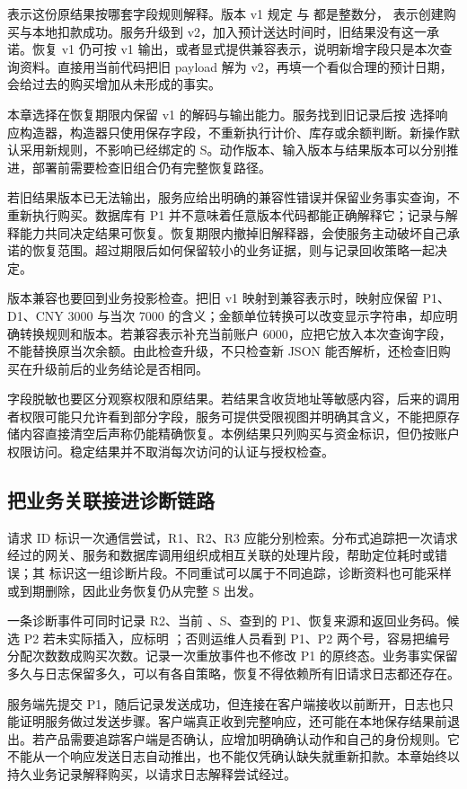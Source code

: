  表示这份原结果按哪套字段规则解释。版本 v1 规定  与  都是整数分， 表示创建购买与本地扣款成功。服务升级到 v2，加入预计送达时间时，旧结果没有这一承诺。恢复 v1 仍可按 v1 输出，或者显式提供兼容表示，说明新增字段只是本次查询资料。直接用当前代码把旧 payload 解为 v2，再填一个看似合理的预计日期，会给过去的购买增加从未形成的事实。

本章选择在恢复期限内保留 v1 的解码与输出能力。服务找到旧记录后按  选择响应构造器，构造器只使用保存字段，不重新执行计价、库存或余额判断。新操作默认采用新规则，不影响已经绑定的 S。动作版本、输入版本与结果版本可以分别推进，部署前需要检查旧组合仍有完整恢复路径。

若旧结果版本已无法输出，服务应给出明确的兼容性错误并保留业务事实查询，不重新执行购买。数据库有 P1 并不意味着任意版本代码都能正确解释它；记录与解释能力共同决定结果可恢复。恢复期限内撤掉旧解释器，会使服务主动破坏自己承诺的恢复范围。超过期限后如何保留较小的业务证据，则与记录回收策略一起决定。



版本兼容也要回到业务投影检查。把旧 v1 映射到兼容表示时，映射应保留 P1、D1、CNY 3000 与当次 7000 的含义；金额单位转换可以改变显示字符串，却应明确转换规则和版本。若兼容表示补充当前账户 6000，应把它放入本次查询字段，不能替换原当次余额。由此检查升级，不只检查新 JSON 能否解析，还检查旧购买在升级前后的业务结论是否相同。

字段脱敏也要区分观察权限和原结果。若结果含收货地址等敏感内容，后来的调用者权限可能只允许看到部分字段，服务可提供受限视图并明确其含义，不能把原存储内容直接清空后声称仍能精确恢复。本例结果只列购买与资金标识，但仍按账户权限访问。稳定结果并不取消每次访问的认证与授权检查。

\subsection*{把业务关联接进诊断链路}

请求 ID 标识一次通信尝试，R1、R2、R3 应能分别检索。分布式追踪把一次请求经过的网关、服务和数据库调用组织成相互关联的处理片段，帮助定位耗时或错误；其  标识这一组诊断片段。不同重试可以属于不同追踪，诊断资料也可能采样或到期删除，因此业务恢复仍从完整 S 出发。

一条诊断事件可同时记录 R2、当前 、S、查到的 P1、恢复来源和返回业务码。候选 P2 若未实际插入，应标明 ；否则运维人员看到 P1、P2 两个号，容易把编号分配次数数成购买次数。记录一次重放事件也不修改 P1 的原终态。业务事实保留多久与日志保留多久，可以有各自策略，恢复不得依赖所有旧请求日志都还存在。

服务端先提交 P1，随后记录发送成功，但连接在客户端接收以前断开，日志也只能证明服务做过发送步骤。客户端真正收到完整响应，还可能在本地保存结果前退出。若产品需要追踪客户端是否确认，应增加明确确认动作和自己的身份规则。它不能从一个响应发送日志自动推出，也不能仅凭确认缺失就重新扣款。本章始终以持久业务记录解释购买，以请求日志解释尝试经过。
\FloatBarrier
